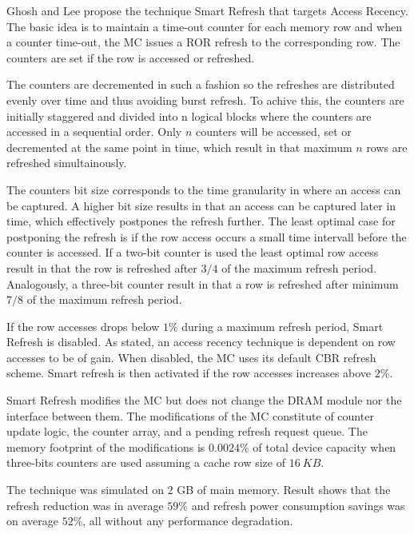 Ghosh and Lee propose the technique Smart Refresh \cite{smartrefresh} that targets Access Recency. The basic idea is to maintain a time-out counter for each memory row and when a counter time-out, the MC issues a ROR refresh to the corresponding row. The counters are set if the row is accessed or refreshed.

The counters are decremented in such a fashion so the refreshes are distributed evenly over time and thus avoiding burst refresh. To achive this, the counters are initially staggered and divided into n logical blocks where the counters are accessed in a sequential order. Only $n$ counters will be accessed, set or decremented at the same point in time, which result in that maximum $n$ rows are refreshed simultainously. 

The counters bit size corresponds to the time granularity in where an access can be captured. A higher bit size results in that an access can be captured later in time, which effectively postpones the refresh further. The least optimal case for postponing the refresh is if the row access occurs a small time intervall before the counter is accessed. If a two-bit counter is used the least optimal row access result in that the row is refreshed after $3/4$ of the maximum refresh period. Analogously, a three-bit counter result in that a row is refreshed after minimum $7/8$ of the maximum refresh period.

If the row accesses drops below $1\%$ during a maximum refresh period, Smart Refresh is disabled. As stated, an access recency technique is dependent on row accesses to be of gain. When disabled, the MC uses its default CBR refresh scheme. Smart refresh is then activated if the row accesses increases above $2\%$.

Smart Refresh modifies the MC but does not change the DRAM module nor the interface between them. The modifications of the MC constitute of counter update logic, the counter array, and a pending refresh request queue. The memory footprint of the modifications is $0.0024\%$ of total device capacity when three-bits counters are used assuming a cache row size of $16\:KB$.

The technique was simulated on $2$ GB of main memory. Result shows that the refresh reduction was in average $59\%$ and refresh power consumption savings was on average $52\%$, all without any performance degradation.